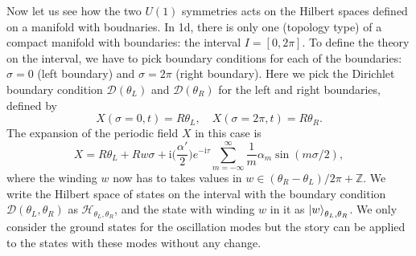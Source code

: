 \documentclass[
]{scrartcl}
\numberwithin{equation}{section}
\theoremstyle{definition}
\theoremstyle{definition}
\theoremstyle{definition}
\theoremstyle{definition}
\theoremstyle{remark}
\begin{document}
Now let us see how the two \(U(1)\) symmetries acts on the Hilbert spaces defined on a manifold with boudnaries. In 1d, there is only one (topology type) of a compact manifold with boundaries: the interval \(I = [0,2\pi]\).
To define the theory on the interval, we have to pick boundary conditions for each of the boundaries: \(\sigma =0\) (left boundary) and \(\sigma =2\pi\) (right boundary).
Here we pick the Dirichlet boundary condition \(\mathcal{D}(\theta_L)\) and \(\mathcal{D}(\theta_R)\) for the left and right boundaries,
defined by
\begin{equation}
    \label{eq:Dirichlet}
    X(\sigma = 0,t) = R \theta_L, \quad X(\sigma = 2\pi, t)= R \theta_R.
\end{equation}
The expansion of the periodic field \(X\) in this case is
\begin{equation}
    \label{eq:XexpDirichlet}
    X = R\theta_L + R w \sigma + \mathrm{i}\bigl(\frac{\alpha'}{2}\bigr) e^{-\mathrm{i}\tau} \sum_{m = -\infty}^{\infty}  \frac1m \alpha_m \sin(m \sigma/2),
\end{equation}
where the winding \(w\) now has to takes values in \(w \in (\theta_R-\theta_L)/2\pi + \mathbb{Z}\).
We write the Hilbert space of states on the interval with the boundary condition \(\mathcal{D}(\theta_L,\theta_R)\) as \(\mathcal{H}_{\theta_L,\theta_R}\), and the state with winding \(w\) in it as \(\ket{w}_{\theta_L,\theta_R}\). We only consider the ground states for the oscillation modes but the story can be applied to the states with these modes without any change.
\end{document}
